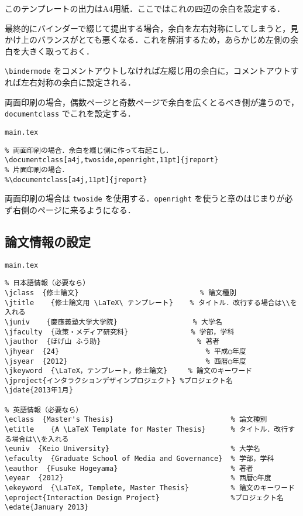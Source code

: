 このテンプレートの出力はA4用紙．ここではこれの四辺の余白を設定する．

最終的にバインダーで綴じて提出する場合，余白を左右対称にしてしまうと，見かけ上のバランスがとても悪くなる．これを解消するため，あらかじめ左側の余白を大きく取っておく．

\verb|\bindermode| をコメントアウトしなければ左綴じ用の余白に，コメントアウトすれば左右対称の余白に設定される．

両面印刷の場合，偶数ページと奇数ページで余白を広くとるべき側が違うので，\verb|documentclass| でこれを設定する．

\begin{itembox}[l]{\texttt{main.tex}}
\begin{verbatim}
% 両面印刷の場合．余白を綴じ側に作って右起こし．
\documentclass[a4j,twoside,openright,11pt]{jreport}
% 片面印刷の場合．
%\documentclass[a4j,11pt]{jreport}
\end{verbatim}
\end{itembox}

両面印刷の場合は \verb|twoside| を使用する．\verb|openright| を使うと章のはじまりが必ず右側のページに来るようになる．

\subsection{論文情報の設定}
\label{sec:meta}

\begin{itembox}[l]{\texttt{main.tex}}
\begin{verbatim}
% 日本語情報（必要なら）
\jclass  {修士論文}                             % 論文種別
\jtitle    {修士論文用 \LaTeX\ テンプレート}    % タイトル．改行する場合は\\を入れる
\juniv    {慶應義塾大学大学院}                  % 大学名
\jfaculty  {政策・メディア研究科}               % 学部，学科
\jauthor  {ほげ山 ふう助}                       % 著者
\jhyear  {24}                                   % 平成○年度
\jsyear  {2012}                                 % 西暦○年度
\jkeyword  {\LaTeX，テンプレート，修士論文}     % 論文のキーワード
\jproject{インタラクションデザインプロジェクト} %プロジェクト名
\jdate{2013年1月}

% 英語情報（必要なら）
\eclass  {Master's Thesis}                            % 論文種別
\etitle    {A \LaTeX Template for Master Thesis}      % タイトル．改行する場合は\\を入れる
\euniv  {Keio University}                             % 大学名
\efaculty  {Graduate School of Media and Governance}  % 学部，学科
\eauthor  {Fusuke Hogeyama}                           % 著者
\eyear  {2012}                                        % 西暦○年度
\ekeyword  {\LaTeX, Templete, Master Thesis}          % 論文のキーワード
\eproject{Interaction Design Project}                 %プロジェクト名
\edate{January 2013}
\end{verbatim}
\end{itembox}

